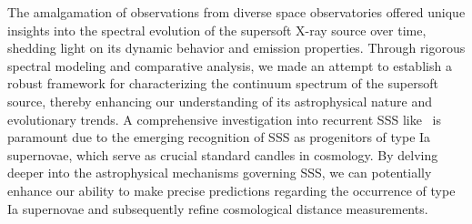 	The amalgamation of observations from diverse space observatories offered unique insights into the spectral evolution of the supersoft X-ray source over time, shedding light on its dynamic behavior and emission properties. Through rigorous spectral modeling and comparative analysis, we made an attempt to establish a robust framework for characterizing the continuum spectrum of the supersoft source, thereby enhancing our understanding of its astrophysical nature and evolutionary trends. A comprehensive investigation into recurrent SSS like \source\ is paramount due to the emerging recognition of SSS as progenitors of type Ia supernovae, which serve as crucial standard candles in cosmology. By delving deeper into the astrophysical mechanisms governing SSS, we can potentially enhance our ability to make precise predictions regarding the occurrence of type Ia supernovae and subsequently refine cosmological distance measurements. %